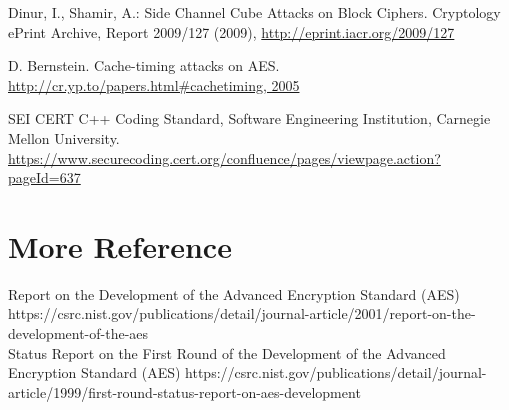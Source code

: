 \documentclass[twoside]{article}
\begin{document}
\begin{thebibliography}{99}
Dinur, I., Shamir, A.: Side Channel Cube Attacks on Block Ciphers. Cryptology ePrint Archive, Report 2009/127 (2009),
\newblock \url{http://eprint.iacr.org/2009/127}

D. Bernstein. Cache-timing attacks on AES.
\newblock \url{http://cr.yp.to/papers.html\#cachetiming, 2005}

SEI CERT C++ Coding Standard, Software Engineering Institution, Carnegie Mellon University.
\newblock \url{https://www.securecoding.cert.org/confluence/pages/viewpage.action?pageId=637}

\end{thebibliography}

\section{More Reference}
Report on the Development of the Advanced Encryption Standard (AES)\\
https://csrc.nist.gov/publications/detail/journal-article/2001/report-on-the-development-of-the-aes\\

Status Report on the First Round of the Development of the Advanced Encryption Standard (AES)
https://csrc.nist.gov/publications/detail/journal-article/1999/first-round-status-report-on-aes-development

\end{document}
